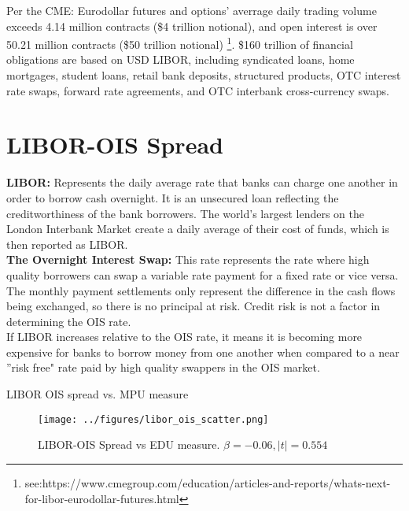 \documentclass[11pt]{article}
\begin{document}
Per the CME: Eurodollar futures and options' averrage daily trading volume exceeds 4.14 million contracts (\$4 trillion notional), and open interest is over 50.21 million contracts (\$50 trillion notional) \footnote{see:https://www.cmegroup.com/education/articles-and-reports/whats-next-for-libor-eurodollar-futures.html }. \$160 trillion of financial obligations are based on USD LIBOR, including syndicated loans, home mortgages, student loans, retail bank deposits, structured products, OTC interest rate swaps, forward rate agreements, and OTC interbank cross-currency swaps. 

 
\section{LIBOR-OIS Spread}
\textbf{LIBOR:} Represents the daily average rate that banks can charge one another in order to borrow cash overnight. It is an unsecured loan reflecting the creditworthiness of the bank borrowers. The world's largest lenders on the London Interbank Market create a daily average of their cost of funds, which is then reported as LIBOR. \\

\noindent \textbf{The Overnight Interest Swap:} This rate represents the rate where high quality borrowers can swap a variable rate payment for a fixed rate or vice versa. The monthly payment settlements only represent the difference in the cash flows being exchanged, so there is no principal at risk. Credit risk is not a factor in determining the OIS rate. \\

If LIBOR increases relative to the OIS rate, it means it is becoming more expensive for banks to borrow money from one another when compared to a near ''risk free" rate paid by high quality swappers in the OIS market.

LIBOR OIS spread vs. MPU measure 
\begin{figure}
	\centering
	\texttt{[image: ../figures/libor\_ois\_scatter.png]}
	\caption{LIBOR-OIS Spread vs EDU measure. $\beta = -0.06, |t| = 0.554$}
	\label{fig:spread_mpu}
\end{figure}
\end{document}
